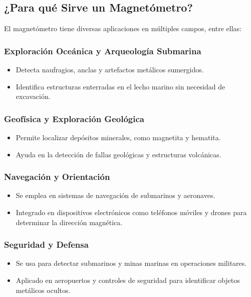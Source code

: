 \subsection{\textbf{¿Para qué Sirve un Magnetómetro?}}
El magnetómetro tiene diversas aplicaciones en múltiples campos, entre ellas:

\subsubsection{\textbf{Exploración Oceánica y Arqueología Submarina}}
\begin{itemize}
	\item Detecta naufragios, anclas y artefactos metálicos sumergidos.
	\item Identifica estructuras enterradas en el lecho marino sin necesidad de excavación.
\end{itemize}

\subsubsection{\textbf{Geofísica y Exploración Geológica}}
\begin{itemize}
	\item Permite localizar depósitos minerales, como magnetita y hematita.
	\item Ayuda en la detección de fallas geológicas y estructuras volcánicas.
\end{itemize}

\subsubsection{\textbf{Navegación y Orientación}}
\begin{itemize}
	\item Se emplea en sistemas de navegación de submarinos y aeronaves.
	\item Integrado en dispositivos electrónicos como teléfonos móviles y drones para determinar la dirección magnética.
\end{itemize}

\subsubsection{\textbf{Seguridad y Defensa}}
\begin{itemize}
	\item Se usa para detectar submarinos y minas marinas en operaciones militares.
	\item Aplicado en aeropuertos y controles de seguridad para identificar objetos metálicos ocultos.
\end{itemize}

